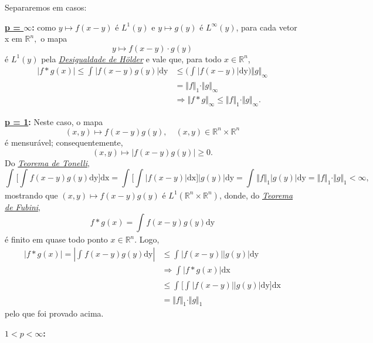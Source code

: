 \documentclass[../distribution_theory_notes.tex]{subfiles}
\begin{document}
    \begin{proof*}
         Separaremos em casos: 

         \textbf{\underline{p = \(\infty\)}:} como \(y\mapsto f(x-y)\) é \(L^{1}(y)\) e \(y\mapsto g(y)\) é \(L^{\infty}(y)\), para cada vetor x em \(\mathbb{R}^{n},\) o mapa 
           \[
             y\mapsto f(x-y)\cdot g(y)
           \]
           é \(L^{1}(y)\) pela \hyperlink{holder_inequality}{\textit{Desigualdade de Hölder}} e vale que, para todo \(x\in \mathbb{R}^{n}\), 
          \begin{align*}
            |f*g(x)|\leq \int_{}^{}|f(x-y)g(y)| \mathrm{dy} & \leq \biggl(\int_{}^{}|f(x-y)| \mathrm{dy}\biggr) \Vert g \Vert_{\infty}\\ 
                                                            &=\Vert f \Vert_1 \cdot \Vert g \Vert_{\infty}\\ 
                                                            &\Rightarrow \Vert f*g \Vert_{\infty}\leq \Vert f \Vert_1 \cdot \Vert g \Vert_{\infty}.
          \end{align*}

          \textbf{\underline{p = 1}:} Neste caso, o mapa 
            \[
              (x, y)\mapsto f(x-y)g(y),\quad (x, y)\in \mathbb{R}^{n}\times \mathbb{R}^{n} 
            \]
            é mensurável; consequentemente, 
              \[
                (x, y)\mapsto |f(x-y)g(y)| \geq 0.
              \]
              Do \hyperlink{fubini_tonelli}{\textit{Teorema de Tonelli}}, 
                \[
                  \int_{}^{}\biggl[\int_{}^{}f(x-y)g(y) \mathrm{dy}\biggr] \mathrm{dx}=\int_{}^{}\biggl[\int_{}^{}|f(x-y)| \mathrm{dx} \biggr]|g(y)| \mathrm{dy}= \int_{}^{}\Vert f \Vert_1 |g(y)| \mathrm{dy} = \Vert f \Vert_1 \cdot \Vert g \Vert_1 <\infty,
                \]
                mostrando que \((x, y)\mapsto f(x-y)g(y)\) é \(L^{1}(\mathbb{R}^{n}\times \mathbb{R}^{n})\), donde, do \hyperlink{fubini_tonelli}{\textit{Teorema de Fubini}}, 
                  \[
                    f*g(x)=\int_{}^{}f(x-y)g(y) \mathrm{dy}
                  \]
                  é finito em quase todo ponto \(x\in \mathbb{R}^{n}.\) Logo, 
                 \begin{align*}
                   |f*g(x)| = |\int_{}^{}f(x-y)g(y) \mathrm{dy}| &\leq \int_{}^{}|f(x-y)||g(y)| \mathrm{dy}\\ 
                                                                 &\Rightarrow \int_{}^{}|f*g(x)| \mathrm{dx}\\ 
                                                                 &\leq \int_{}^{}\biggl[\int_{}^{}|f(x-y)||g(y)| \mathrm{dy}\biggr] \mathrm{dx}\\ 
                                                                 &= \Vert f \Vert_1 \cdot \Vert g \Vert_1
                 \end{align*}
                 pelo que foi provado acima.

                 \textbf{\underline{\(1<p<\infty\)}:}

       \end{proof*}
\end{document}
